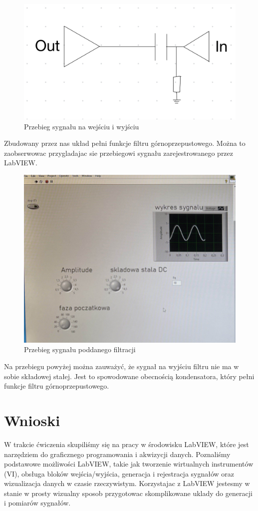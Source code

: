 \documentclass[11pt]{article}
\begin{document}
\begin{figure}[H]
    \centering
    \includegraphics[width=0.5\linewidth]{img/image.png}
    \caption{Przebieg sygnału na wejściu i wyjściu}
    \label{fig:placeholder}
\end{figure}

Zbudowany przez nas układ pełni funkcje filtru górnoprzepustowego. Można to zaobserwowac przygladajac sie przebiegowi sygnału zarejestrowanego przez 
LabVIEW.

\begin{figure}[H]
    \centering
    \includegraphics[width=0.5\linewidth]{img/image2.jpg}
    \caption{Przebieg sygnału poddanego filtracji}
    \label{fig:placeholder}
\end{figure}

Na przebiegu powyżej można zauważyć, że sygnał na wyjściu filtru nie ma w sobie składowej stałej. Jest to spowodowane
 obecnością kondensatora, który pełni funkcje filtru górnoprzepustowego.

\section{Wnioski}
  W trakcie ćwiczenia skupiliśmy się na pracy w środowisku LabVIEW, które jest 
  narzędziem do graficznego programowania i akwizycji danych. Poznaliśmy podstawowe
   możliwości LabVIEW, takie jak tworzenie wirtualnych instrumentów (VI), obsługa 
   bloków wejścia/wyjścia, generacja i rejestracja sygnałów oraz wizualizacja danych
    w czasie rzeczywistym. Korzystajac z LabVIEW jestesmy w stanie w prosty wizualny sposob 
    przygotowac skomplikowane uklady do generacji i pomiarów sygnałów.
\end{document}
